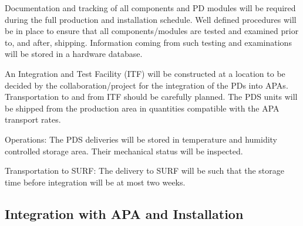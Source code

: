 Documentation and tracking of all components and PD modules will be required during the full production and installation schedule. Well defined procedures will be in place to ensure that all components/modules are tested and examined prior to, and after, shipping. Information coming from such testing and examinations will be stored in a hardware database.

An Integration and Test Facility (ITF) will be constructed at a location to be decided by the collaboration/project for the integration of the PDs into APAs. Transportation to and from ITF should be carefully planned. The PDS units will be shipped from the production area in quantities compatible with the APA transport rates.
    
Operations: The PDS deliveries will be stored in temperature and humidity controlled storage area. Their mechanical status will be inspected.

Transportation to SURF: The delivery to SURF will be such that the storage time before integration will be at most two weeks.


\subsection{Integration with APA and Installation}
\label{sec:fdsp-pd-install-pd-apa}




